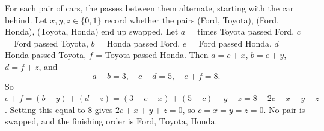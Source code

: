 For each pair of cars, the passes between them alternate, starting with the car behind. Let $x,y,z\in\{0,1\}$ record whether the pairs (Ford, Toyota), (Ford, Honda), (Toyota, Honda) end up swapped. Let $a$ = times Toyota passed Ford, $c$ = Ford passed Toyota, $b$ = Honda passed Ford, $e$ = Ford passed Honda, $d$ = Honda passed Toyota, $f$ = Toyota passed Honda. Then $a=c+x$, $b=e+y$, $d=f+z$, and
\[a+b=3,\quad c+d=5,\quad e+f=8.\]
So $e+f=(b-y)+(d-z)=(3-c-x)+(5-c)-y-z=8-2c-x-y-z$. Setting this equal to $8$ gives $2c+x+y+z=0$, so $c=x=y=z=0$. No pair is swapped, and the finishing order is $\boxed{\text{Ford, Toyota, Honda}}$.
